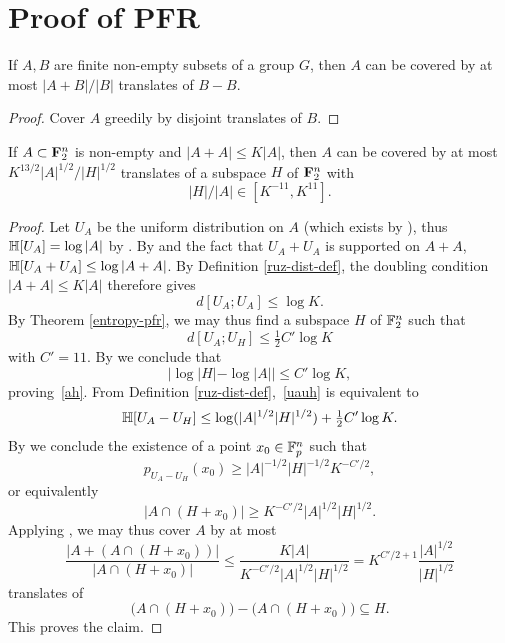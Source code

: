 \chapter{Proof of PFR}

\begin{lemma}
\label{ruz-cov}
\leanok
If $A,B$ are finite non-empty subsets of a group $G$, then $A$ can be covered by at most $|A+B|/|B|$ translates of $B-B$.
\end{lemma}
\begin{proof}
\leanok
Cover $A$ greedily by disjoint translates of $B$.
\end{proof}

\begin{lemma}\label{pfr_aux}
  \leanok If $A \subset {\bf F}_2^n$ is non-empty and
  $|A+A| \leq K|A|$, then $A$ can be covered by at most $K ^
  {13/2}|A|^{1/2}/|H|^{1/2}$ translates of a subspace $H$ of ${\bf F}_2^n$ with
  \begin{equation}
    \label{ah}
    |H|/|A| \in [K^{-11}, K^{11}].
  \end{equation}
  \end{lemma}

\begin{proof}
\leanok
  Let $U_A$ be the uniform distribution on $A$ (which exists by ), thus $\mathbb{H}[U_A] = \log |A|$ by . By  and the fact that $U_A + U_A$ is supported on $A + A$, $\mathbb{H}[U_A + U_A] \leq \log|A+A|$. By Definition \ref{ruz-dist-def}, the doubling condition $|A+A| \leq K|A|$ therefore gives
  \[d[U_A;U_A] \leq \log K.\]
  By Theorem \ref{entropy-pfr}, we may thus find a subspace $H$ of $\mathbb{F}_2^n$ such that
  \begin{equation}\label{uauh} d[U_A;U_H] \leq \tfrac{1}{2} C' \log K\end{equation}
  with $C' = 11$.
  By  we conclude that
  \begin{equation*}
    |\log |H| - \log |A|| \leq C' \log K,
  \end{equation*}
  proving~\eqref{ah}.
  From Definition \ref{ruz-dist-def},~\eqref{uauh} is equivalent to
  \[\mathbb{H}[U_A - U_H] \leq \log( |A|^{1/2} |H|^{1/2}) + \tfrac{1}{2} C' \log K.\]
  By  we conclude the existence of a point $x_0 \in \mathbb{F}_p^n$ such that
  \[p_{U_A-U_H}(x_0) \geq |A|^{-1/2} |H|^{-1/2} K^{-C'/2},\]
  or equivalently
  \[|A \cap (H + x_0)| \geq K^{-C'/2} |A|^{1/2} |H|^{1/2}.\]
  Applying , we may thus cover $A$ by at most
  \[\frac{|A + (A \cap (H+x_0))|}{|A \cap (H + x_0)|} \leq \frac{K|A|}{K^{-C'/2} |A|^{1/2} |H|^{1/2}} = K^{C'/2+1} \frac{|A|^{1/2}}{|H|^{1/2}}\]
  translates of
  \[\bigl(A \cap (H + x_0)\bigr) - \bigl(A \cap (H + x_0)\bigr) \subseteq H.\]
  This proves the claim.
\end{proof}


